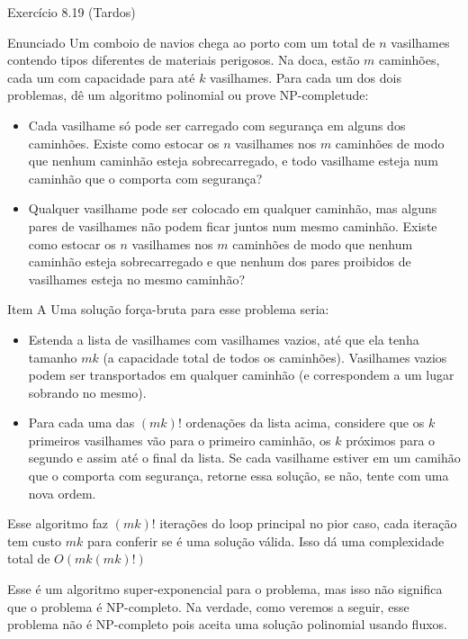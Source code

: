 \documentclass[presentation]{beamer}
\begin{document}
\begin{frame}[fragile,label=sec-6]{Exercício 8.19 (Tardos)}

 \begin{block}{Enunciado}
Um comboio de navios chega ao porto com um total de $n$ vasilhames
contendo tipos diferentes de materiais perigosos.
Na doca, estão $m$ caminhões, cada um com capacidade para até $k$
vasilhames.  Para cada um dos dois problemas, dê um algoritmo
polinomial ou prove NP-completude:


\begin{itemize}
\item Cada vasilhame só pode ser carregado com segurança em alguns
dos caminhões. Existe como estocar os $n$ vasilhames nos $m$
caminhões de modo que nenhum caminhão esteja sobrecarregado, e
todo vasilhame esteja num caminhão que o comporta com segurança?

\item Qualquer vasilhame pode ser colocado em qualquer caminhão,
mas alguns pares de vasilhames não podem ficar juntos num mesmo
caminhão. Existe como estocar os $n$ vasilhames nos $m$
caminhões de modo que nenhum caminhão esteja sobrecarregado e
que nenhum dos pares proibidos de vasilhames esteja no mesmo
caminhão?
\end{itemize}
\end{block}

\begin{block}{Item A}
Uma solução força-bruta para esse problema seria:

\begin{itemize}
\item Estenda a lista de vasilhames com vasilhames vazios, até que ela
tenha tamanho $mk$ (a capacidade total de todos os
caminhões). Vasilhames vazios podem ser transportados em qualquer
caminhão (e correspondem a um lugar sobrando no mesmo).
\item Para cada uma das $(mk)!$ ordenações da lista acima, considere que
os $k$ primeiros vasilhames vão para o primeiro caminhão, os $k$
próximos para o segundo e assim até o final da lista. Se cada
vasilhame estiver em um camihão que o comporta com segurança,
retorne essa solução, se não, tente com uma nova ordem.
\end{itemize}

Esse algoritmo faz $(mk)!$ iterações do loop principal no pior caso, cada
iteração tem custo $mk$ para conferir se é uma solução válida. Isso dá
uma complexidade total de $O(mk(mk)!)$

Esse é um algoritmo super-exponencial para o problema, mas isso não
significa que o problema é NP-completo. Na verdade, como veremos a
seguir, esse problema não é NP-completo pois aceita uma solução
polinomial usando fluxos.


\end{block}
\end{frame}
\end{document}
